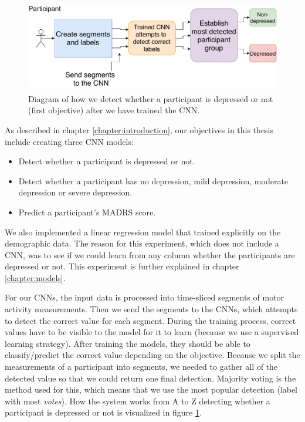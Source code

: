 \begin{figure}[h]
  \begin{center}
      \includegraphics[height=4cm]{img/flow_detection.pdf}
      \caption{Diagram of how we detect whether a participant is depressed or not (first objective) after we have trained the CNN. }
      \label{figure:flow}
  \end{center}
\end{figure}

\noindent As described in chapter \ref{chapter:introduction}, our objectives in this thesis include creating three CNN models:

\begin{itemize}
  \item Detect whether a participant is depressed or not.
  \item Detect whether a participant has no depression, mild depression, moderate depression or severe depression.
  \item Predict a participant's MADRS score.
\end{itemize}

\noindent We also implemented a linear regression model that trained explicitly on the demographic data. The reason for this experiment, which does not include a CNN, was to see if we could learn from any column whether the participants are depressed or not. This experiment is further explained in chapter \ref{chapter:models}. 

For our CNNs, the input data is processed into time-sliced segments of motor activity measurements. Then we send the segments to the CNNs, which attempts to detect the correct value for each segment. During the training process, correct values have to be visible to the model for it to learn (because we use a supervised learning strategy). After training the models, they should be able to classify/predict the correct value depending on the objective. Because we split the measurements of a participant into segments, we needed to gather all of the detected value so that we could return one final detection. Majority voting is the method used for this, which means that we use the most popular detection (label with most \textit{votes}). How the system works from A to Z detecting whether a participant is depressed or not is visualized in figure \ref{figure:flow}.

